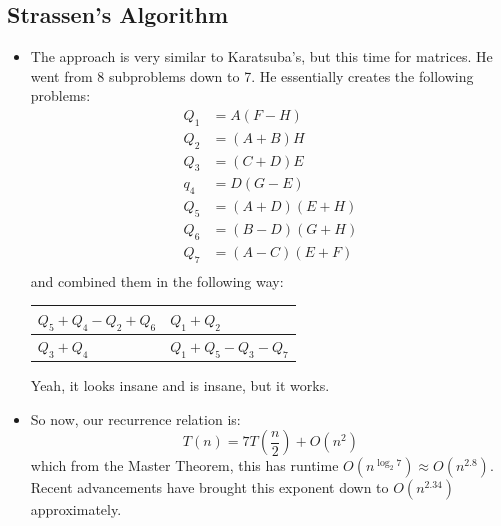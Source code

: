 \subsection{Strassen's Algorithm}
\begin{itemize}
	\item The approach is very similar to Karatsuba's, but this time for matrices. He went from 8 subproblems down to 7. He 
		essentially creates the following problems:
		\begin{align*}
			Q_1 &= A(F - H) \\
			Q_2&= (A + B)H \\
			Q_3&= (C + D)E \\
			q_4 &=  D(G - E) \\
			Q_5 &=  (A + D)(E + H) \\
			Q_6 &= (B - D)(G + H) \\
			Q_7 &=  (A - C)(E + F) \\
		\end{align*}
		and combined them in the following way:
		\renewcommand{\arraystretch}{4}
		\begin{center}
			\begin{tabular}{|M{2.5cm}|M{2.5cm}|}
				\hline
				\( Q_5 + Q_4 - Q_2 + Q_6 \) & \( Q_1 + Q_2 \) \\ \hline 
				\( Q_3 + Q_4 \) & \( Q_1 + Q_5 - Q_3 - Q_7 \)\\ \hline
			\end{tabular}
		\end{center}
		Yeah, it looks insane and is insane, but it works.
		\renewcommand{\arraystretch}{1}
	\item So now, our recurrence relation is:
		\[
		T(n) = 7T\left( \frac{n}{2} \right) + O(n^2)
		\] 
		which from the Master Theorem, this has runtime \( O(n^{\log_2 7}) \approx O(n ^{2.8}) \). Recent advancements have 
		brought this exponent down to \( O(n^{2.34}) \) approximately.
\end{itemize}
